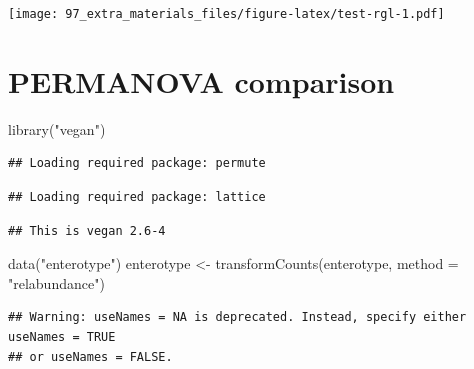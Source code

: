 \documentclass[
]{book}
\newenvironment{Shaded}{\begin{snugshade}}{\end{snugshade}}
\newcommand{\AttributeTok}[1]{\textcolor[rgb]{0.77,0.63,0.00}{#1}}
\newcommand{\FunctionTok}[1]{\textcolor[rgb]{0.00,0.00,0.00}{#1}}
\newcommand{\NormalTok}[1]{#1}
\newcommand{\OtherTok}[1]{\textcolor[rgb]{0.56,0.35,0.01}{#1}}
\newcommand{\StringTok}[1]{\textcolor[rgb]{0.31,0.60,0.02}{#1}}
\begin{document}
\texttt{[image: 97\_extra\_materials\_files/figure-latex/test-rgl-1.pdf]}

\hypertarget{permanova-comparison}{%
\section{PERMANOVA comparison}\label{permanova-comparison}}

\begin{Shaded}
\begin{Highlighting}[]
\FunctionTok{library}\NormalTok{(}\StringTok{"vegan"}\NormalTok{)}
\end{Highlighting}
\end{Shaded}

\begin{verbatim}
## Loading required package: permute
\end{verbatim}

\begin{verbatim}
## Loading required package: lattice
\end{verbatim}

\begin{verbatim}
## This is vegan 2.6-4
\end{verbatim}

\begin{Shaded}
\begin{Highlighting}[]
\FunctionTok{data}\NormalTok{(}\StringTok{"enterotype"}\NormalTok{)}
\NormalTok{enterotype }\OtherTok{\textless{}{-}} \FunctionTok{transformCounts}\NormalTok{(enterotype, }\AttributeTok{method =} \StringTok{"relabundance"}\NormalTok{)}
\end{Highlighting}
\end{Shaded}

\begin{verbatim}
## Warning: useNames = NA is deprecated. Instead, specify either useNames = TRUE
## or useNames = FALSE.
\end{verbatim}
\end{document}
